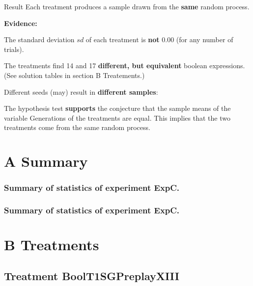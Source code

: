 \documentclass[18pt,c]{beamer}
\begin{document}
\begin{frame}
\vspace*{2mm}
\begin{block}{
Result
}
Each treatment produces a sample drawn from the {\bf same} random process.
 
{\bf Evidence:}
 
The standard deviation $sd$ of each treatment is {\bf not} $0.00$
(for any number of trials).
 
The treatments find 14 and 17 {\bf different, but equivalent} boolean expressions.
(See solution tables in section B Treatements.)
 
Different seeds (may) result in {\bf different samples}:
 
The hypothesis test {\bf supports} the conjecture
that the sample means of the variable Generations of the treatments are equal.
This implies that the two treatments come from the same random process.
\end{block}
\end{frame}%
\clearpage
\section{A Summary}
 \begin{frame}
 \fontsize{8pt}{9pt}\selectfont
 \frametitle{ Summary of statistics of experiment ExpC. }

 \label{ExpCStatsTable005.tex}  
 \end{frame}

 \begin{frame}
 \fontsize{8pt}{9pt}\selectfont
 \frametitle{ Summary of statistics of experiment ExpC. }

 \label{ExpCStatsTable006.tex}  
 \end{frame}

\clearpage
\section{B Treatments}
\clearpage
\subsection{Treatment BoolT1SGPreplayXIII}
\end{document}
